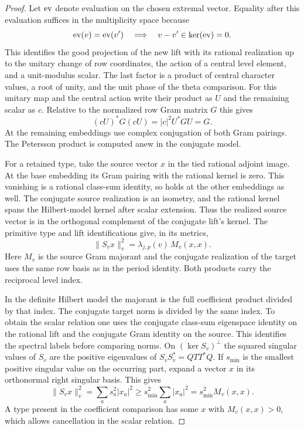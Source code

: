 \begin{proof}
Let \({\rm ev}\) denote evaluation on the chosen extremal vector. Equality after this evaluation suffices in the multiplicity space because
\[
 {\rm ev}(v)={\rm ev}(v')\quad\Longrightarrow\quad v-v'\in\ker({\rm ev})=0 .
\] This identifies
the good projection of the new lift with its rational realization up to the unitary change of row coordinates, the action of
a central level element, and a unit-modulus scalar.
The last factor is a product of central character
values, a root of unity, and the unit phase of the
theta comparison. For this unitary map and the central action write their
product as \(U\) and the remaining scalar as \(c\). Relative to
the normalized row Gram matrix \(G\) this gives
\[
 (cU)^*G(cU)=|c|^2 U^*GU=G .
\] At the remaining embeddings
use complex conjugation of both Gram pairings. The
Petersson product is computed anew in the conjugate
model.

For a retained type, take the source vector \(x\)
in the tied rational adjoint image. At the base
embedding its Gram pairing with the rational kernel
is zero. This vanishing is a rational class-sum identity,
so holds at the other embeddings as well. The conjugate
source realization is an isometry, and the rational kernel
spans the Hilbert-model kernel after scalar extension.
Thus the realized source vector is in the orthogonal
complement of the conjugate lift's kernel. The primitive
type and lift identifications give, in its metrics,
\[
 \|S_v x\|_v^2=\lambda_{j,p}(v)\,M_v(x,x).
\]
Here \(M_v\) is the source Gram majorant and the
conjugate realization of the target uses the same
row basis as in the period identity. Both products
carry the reciprocal level index.

In the definite
Hilbert model the majorant is the full coefficient
product divided by that index. The conjugate
target norm is divided by the same index. To obtain
the scalar relation one uses the conjugate
class-sum eigenspace identity on the rational lift and
the conjugate Gram identity on the source. This
identifies the spectral labels before comparing
norms. On \((\ker S_v)^\perp\) the squared singular
values of \(S_v\) are the positive eigenvalues
of \(S_v S_v^*=QTT^*Q\). If \(s_{\min}\) is the smallest positive singular value on the
occurring part, expand a vector \(x\) in its orthonormal right
singular basis. This gives
\[
 \|S_vx\|_v^2=\sum_a s_a^2|x_a|^2
       \ge s_{\min}^2\sum_a|x_a|^2=s_{\min}^2 M_v(x,x).
\] A type present in the
coefficient comparison has some \(x\) with
\(M_v(x,x)>0\), which allows cancellation in the
scalar relation.


\end{proof}
